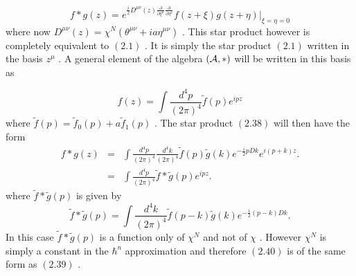 \documentclass[a4paper,12pt]{article}
\begin{document}
\begin{equation}
f*g(z)=e^{\frac{i}{2}{D}^{{\mu}{\nu}}(z)\frac{\partial}{\partial{\xi}^{\mu}}\frac{\partial}{\partial{\eta}^{\nu}}}f(z+{\xi})g(z+{\eta})|_{{\xi}={\eta}=0}
\end{equation}
where now  $D^{{\mu}{\nu}}(z)={\chi}^N( {\theta}^{{\mu}{\nu}} +
ia{\eta}^{{\mu}{\nu}} ) $ . This star product however is
completely equivalent to $(2.1)$ . It is simply the star product
$(2.1)$ written in the basis $z^{\mu}$  . A general element of
the algebra $({\cal A},*)$ will be written in this basis as


\begin{equation}
f(z)=\int \frac{d^4p}{(2{\pi})^4}\tilde{f}(p) e^{ipz}
\end{equation}
where $\tilde{f}(p)={\tilde{f}}_0(p)+a{\tilde{f}}_1(p)$ . The
star product $(2.38)$ will then have the form
\begin{eqnarray}
f*g(z)&=&\int\frac{d^4p}{(2{\pi})^4}\frac{d^4k}{(2{\pi})^4}\tilde{f}(p)\tilde{g}(k)e^{-\frac{i}{2}pDk}e^{i(p+k)z} .\nonumber\\
&=&\int\frac{d^4p}{(2{\pi})^4}\tilde{f}*\tilde{g}(p)e^{ipz}.
\end{eqnarray}
where $\tilde{f}*\tilde{g}(p)$ is given by
\begin{equation}
\tilde{f}*\tilde{g}(p)=\int\frac{d^4k}{(2{\pi})^4}\tilde{f}(p-k)\tilde{g}(k)e^{-\frac{i}{2}(p-k)Dk}.
\end{equation}
In this case $\tilde{f}*\tilde{g}(p)$ is a function only of
${\chi}^N$ and not of ${\chi}$ . However ${\chi}^N$ is simply a
constant in the ${\hbar}^n$ approximation and therefore $(2.40)$
is of the same form as $(2.39)$ .
\end{document}
